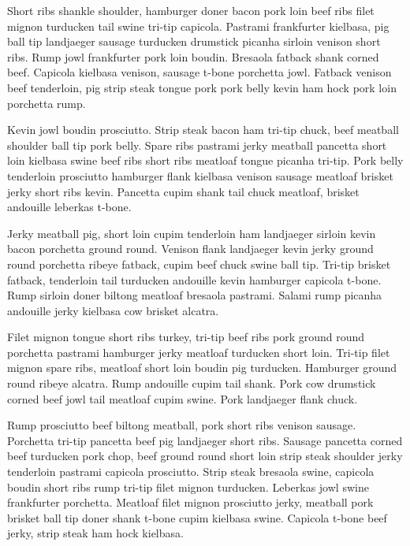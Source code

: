 \documentclass[openany,letterpaper,11pt]{report}
\begin{document}
Short ribs shankle shoulder, hamburger doner bacon pork loin beef ribs filet mignon turducken tail swine tri-tip capicola. Pastrami frankfurter kielbasa, pig ball tip landjaeger sausage turducken drumstick picanha sirloin venison short ribs. Rump jowl frankfurter pork loin boudin. Bresaola fatback shank corned beef. Capicola kielbasa venison, sausage t-bone porchetta jowl. Fatback venison beef tenderloin, pig strip steak tongue pork pork belly kevin ham hock pork loin porchetta rump.\newline

Kevin jowl boudin prosciutto. Strip steak bacon ham tri-tip chuck, beef meatball shoulder ball tip pork belly. Spare ribs pastrami jerky meatball pancetta short loin kielbasa swine beef ribs short ribs meatloaf tongue picanha tri-tip. Pork belly tenderloin prosciutto hamburger flank kielbasa venison sausage meatloaf brisket jerky short ribs kevin. Pancetta cupim shank tail chuck meatloaf, brisket andouille leberkas t-bone.\newline

Jerky meatball pig, short loin cupim tenderloin ham landjaeger sirloin kevin bacon porchetta ground round. Venison flank landjaeger kevin jerky ground round porchetta ribeye fatback, cupim beef chuck swine ball tip. Tri-tip brisket fatback, tenderloin tail turducken andouille kevin hamburger capicola t-bone. Rump sirloin doner biltong meatloaf bresaola pastrami. Salami rump picanha andouille jerky kielbasa cow brisket alcatra.\newline

Filet mignon tongue short ribs turkey, tri-tip beef ribs pork ground round porchetta pastrami hamburger jerky meatloaf turducken short loin. Tri-tip filet mignon spare ribs, meatloaf short loin boudin pig turducken. Hamburger ground round ribeye alcatra. Rump andouille cupim tail shank. Pork cow drumstick corned beef jowl tail meatloaf cupim swine. Pork landjaeger flank chuck.\newline

Rump prosciutto beef biltong meatball, pork short ribs venison sausage. Porchetta tri-tip pancetta beef pig landjaeger short ribs. Sausage pancetta corned beef turducken pork chop, beef ground round short loin strip steak shoulder jerky tenderloin pastrami capicola prosciutto. Strip steak bresaola swine, capicola boudin short ribs rump tri-tip filet mignon turducken. Leberkas jowl swine frankfurter porchetta. Meatloaf filet mignon prosciutto jerky, meatball pork brisket ball tip doner shank t-bone cupim kielbasa swine. Capicola t-bone beef jerky, strip steak ham hock kielbasa.\newline
\end{document}
